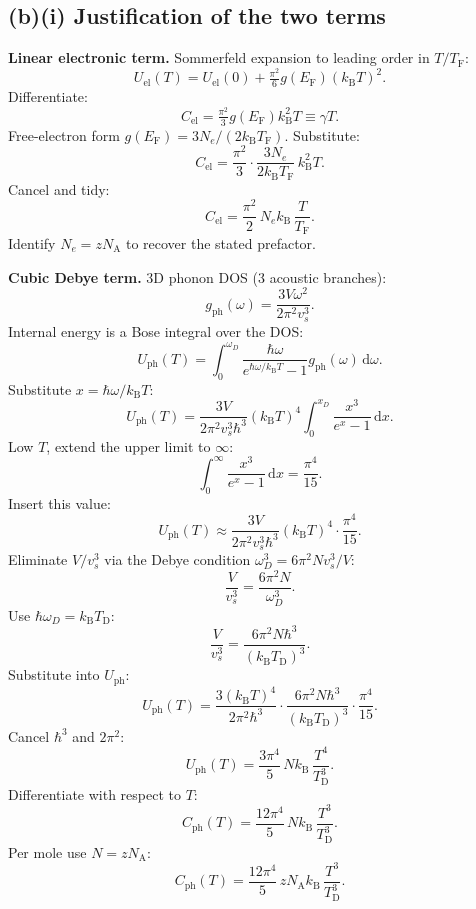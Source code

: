 \documentclass[11pt]{article}
\newcommand{\de}{\mathrm{d}}
\newcommand{\kB}{k_{\mathrm{B}}}
\newcommand{\NA}{N_{\mathrm{A}}}
\newcommand{\TF}{T_{\mathrm{F}}}
\newcommand{\TD}{T_{\mathrm{D}}}
\newcommand{\EF}{E_{\mathrm{F}}}
\begin{document}
\subsection*{(b)(i) Justification of the two terms}

\textbf{Linear electronic term.} Sommerfeld expansion to leading order in $T/\TF$:
\begin{equation}
U_{\mathrm{el}}(T) = U_{\mathrm{el}}(0) + \tfrac{\pi^2}{6}g(\EF)(\kB T)^2.
\label{eq:Uel}
\end{equation}
Differentiate:
\begin{equation}
C_{\mathrm{el}} = \tfrac{\pi^2}{3}g(\EF)\kB^2 T \equiv \gamma T.
\label{eq:CelGamma}
\end{equation}
Free-electron form $g(\EF) = 3N_e/(2\kB\TF)$. Substitute:
\[
C_{\mathrm{el}} = \frac{\pi^2}{3}\cdot\frac{3N_e}{2\kB\TF}\,\kB^2 T.
\]
Cancel and tidy:
\[
C_{\mathrm{el}} = \frac{\pi^2}{2}\,N_e\kB\,\frac{T}{\TF}.
\]
Identify $N_e=z\NA$ to recover the stated prefactor.

\textbf{Cubic Debye term.} 3D phonon DOS (3 acoustic branches):
\begin{equation}
g_{\mathrm{ph}}(\omega) = \frac{3V\omega^2}{2\pi^2 v_s^3}.
\label{eq:gph3D}
\end{equation}
Internal energy is a Bose integral over the DOS:
\[
U_{\mathrm{ph}}(T) = \int_0^{\omega_D}\frac{\hbar\omega}{e^{\hbar\omega/\kB T}-1}g_{\mathrm{ph}}(\omega)\,\de\omega.
\]
Substitute $x=\hbar\omega/\kB T$:
\[
U_{\mathrm{ph}}(T) = \frac{3V}{2\pi^2 v_s^3 \hbar^3}(\kB T)^4 \int_0^{x_D}\frac{x^3}{e^x-1}\,\de x.
\]
Low $T$, extend the upper limit to $\infty$:
\[
\int_0^{\infty}\frac{x^3}{e^x-1}\,\de x = \frac{\pi^4}{15}.
\]
Insert this value:
\[
U_{\mathrm{ph}}(T) \approx \frac{3V}{2\pi^2 v_s^3 \hbar^3}(\kB T)^4 \cdot \frac{\pi^4}{15}.
\]
Eliminate $V/v_s^3$ via the Debye condition $\omega_D^3 = 6\pi^2 N v_s^3/V$:
\[
\frac{V}{v_s^3} = \frac{6\pi^2 N}{\omega_D^3}.
\]
Use $\hbar\omega_D = \kB\TD$:
\[
\frac{V}{v_s^3} = \frac{6\pi^2 N\hbar^3}{(\kB\TD)^3}.
\]
Substitute into $U_{\mathrm{ph}}$:
\[
U_{\mathrm{ph}}(T) = \frac{3(\kB T)^4}{2\pi^2 \hbar^3}\cdot\frac{6\pi^2 N\hbar^3}{(\kB\TD)^3}\cdot\frac{\pi^4}{15}.
\]
Cancel $\hbar^3$ and $2\pi^2$:
\[
U_{\mathrm{ph}}(T) = \frac{3\pi^4}{5}\,N\kB\,\frac{T^4}{\TD^3}.
\]
Differentiate with respect to $T$:
\[
C_{\mathrm{ph}}(T) = \frac{12\pi^4}{5}\,N\kB\,\frac{T^3}{\TD^3}.
\]
Per mole use $N=z\NA$:
\begin{equation}
\boxed{\ C_{\mathrm{ph}}(T) = \frac{12\pi^4}{5}\,z\NA\kB\,\frac{T^3}{\TD^3}.\ }
\label{eq:CphlowT}
\end{equation}
\end{document}
